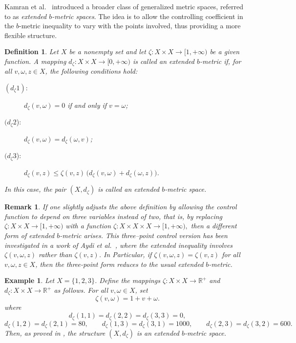 \documentclass[sn-mathphys-num]{sn-jnl}%
\theoremstyle{thmstyleone}%
\theoremstyle{thmstyletwo}%
\newtheorem{example}{Example}%
\newtheorem{remark}{Remark}%
\theoremstyle{thmstylethree}%
\newtheorem{definition}{Definition}
\numberwithin{equation}{section}
\begin{document}
Kamran et al.~\cite{kamran} introduced a broader class of generalized metric spaces, 
referred to as \emph{extended $b$-metric spaces}. The idea is to allow the controlling 
coefficient in the $b$-metric inequality to vary with the points involved, thus 
providing a more flexible structure.
\begin{definition}
Let $X$ be a nonempty set and let $\zeta : X \times X \to [1,+\infty)$ be a given function.  
A mapping $d_{\zeta} : X \times X \to [0,+\infty)$ is called an \emph{extended $b$-metric} 
if, for all $v,\omega,z \in X$, the following conditions hold:
\begin{description}
    \item[$(d_{\zeta}1)$:] $d_{\zeta}(v,\omega)=0$ if and only if $v=\omega$;
    \item[$(d_{\zeta}2$):] $d_{\zeta}(v,\omega)=d_{\zeta}(\omega,v)$;
    \item[$(d_{\zeta}3$):] $d_{\zeta}(v,z) \le \zeta(v,z)\,\big(d_{\zeta}(v,\omega)+d_{\zeta}(\omega,z)\big)$.
\end{description}
In this case, the pair $(X,d_{\zeta})$ is called an \emph{extended $b$-metric space}.
\end{definition}
\vspace{0.2cm}
\begin{remark}
If one slightly adjusts the above definition by allowing the control function 
to depend on three variables instead of two, that is, by replacing 
$\zeta : X \times X \to [1,+\infty)$ with a function $\zeta : X \times X \times X \to [1,+\infty),$ 
then a different form of extended $b$-metric arises.  
This three–point control version has been investigated in a work of 
Aydi et al.~\cite{Aydi}, where the extended inequality involves 
$\zeta(v,\omega,z)$ rather than $\zeta(v,z)$. In Particular, if $\zeta(v,\omega,z)=\zeta(v,z)$ for all $v,\omega,z\in X$, then the 
three-point form reduces to the usual extended $b$-metric.
\end{remark}
\vspace{0.2cm}
\begin{example}
Let $X=\{1,2,3\}$. Define the mappings 
$\zeta : X\times X \to \mathbb{R}^{+}$ and 
$d_{\zeta} : X\times X \to \mathbb{R}^{+}$ as follows. 
For all $v,\omega \in X$, set
\[
\zeta(v,\omega)=1+v+\omega.
\]
where
\[
d_{\zeta}(1,1)=d_{\zeta}(2,2)=d_{\zeta}(3,3)=0,
\]
\[
d_{\zeta}(1,2)=d_{\zeta}(2,1)=80,\qquad
d_{\zeta}(1,3)=d_{\zeta}(3,1)=1000,\qquad
d_{\zeta}(2,3)=d_{\zeta}(3,2)=600.
\]
Then, as proved in \cite{kamran}, the structure $(X, d_{\zeta})$ is an extended $b$-metric space.
\end{example}
\end{document}
